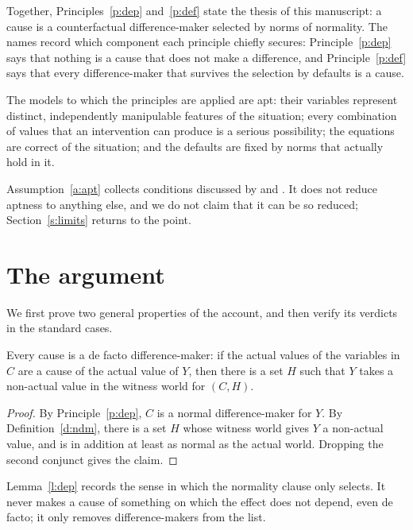 \documentclass{situationist-preprint}
\begin{document}
Together, Principles~\ref{p:dep} and~\ref{p:def} state the thesis of this manuscript: a cause is a counterfactual difference-maker selected by norms of normality. The names record which component each principle chiefly secures: Principle~\ref{p:dep} says that nothing is a cause that does not make a difference, and Principle~\ref{p:def} says that every difference-maker that survives the selection by defaults is a cause.

\begin{assumption}[Aptness]\label{a:apt}
The models to which the principles are applied are apt: their variables represent distinct, independently manipulable features of the situation; every combination of values that an intervention can produce is a serious possibility; the equations are correct of the situation; and the defaults are fixed by norms that actually hold in it.
\end{assumption}

Assumption~\ref{a:apt} collects conditions discussed by \citet{HalpernHitchcock2010} and \citet[ch.~4]{Halpern2016}. It does not reduce aptness to anything else, and we do not claim that it can be so reduced; Section~\ref{s:limits} returns to the point.

\section{The argument}\label{s:argument}

We first prove two general properties of the account, and then verify its verdicts in the standard cases.

\begin{lemma}\label{l:dep}
Every cause is a de facto difference-maker: if the actual values of the variables in $C$ are a cause of the actual value of $Y$, then there is a set $H$ such that $Y$ takes a non-actual value in the witness world for $(C, H)$.
\end{lemma}

\begin{proof}
By Principle~\ref{p:dep}, $C$ is a normal difference-maker for $Y$. By Definition~\ref{d:ndm}, there is a set $H$ whose witness world gives $Y$ a non-actual value, and is in addition at least as normal as the actual world. Dropping the second conjunct gives the claim.
\end{proof}

Lemma~\ref{l:dep} records the sense in which the normality clause only selects. It never makes a cause of something on which the effect does not depend, even de facto; it only removes difference-makers from the list.
\end{document}
